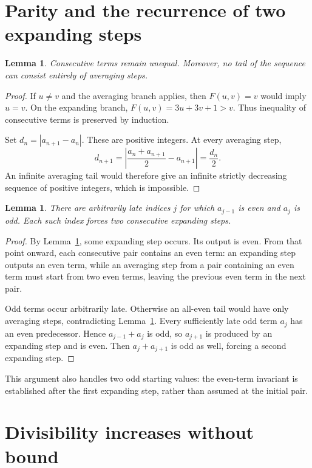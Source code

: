 \documentclass[11pt]{article}
\newtheorem{lemma}[theorem]{Lemma}
\begin{document}
\section{Parity and the recurrence of two expanding steps}

\begin{lemma}\label{lem:distinct}
Consecutive terms remain unequal. Moreover, no tail of the sequence can
consist entirely of averaging steps.
\end{lemma}
\begin{proof}
If $u\ne v$ and the averaging branch applies, then $F(u,v)=v$ would imply
$u=v$. On the expanding branch, $F(u,v)=3u+3v+1>v$. Thus inequality of
consecutive terms is preserved by induction.

Set $d_n=|a_{n+1}-a_n|$. These are positive integers. At every averaging
step,
\[
 d_{n+1}
 =\left|\frac{a_n+a_{n+1}}2-a_{n+1}\right|
 =\frac{d_n}{2}.
\]
An infinite averaging tail would therefore give an infinite strictly
decreasing sequence of positive integers, which is impossible.
\end{proof}

\begin{lemma}\label{lem:blocks}
There are arbitrarily late indices $j$ for which $a_{j-1}$ is even and
$a_j$ is odd. Each such index forces two consecutive expanding steps.
\end{lemma}
\begin{proof}
By Lemma~\ref{lem:distinct}, some expanding step occurs. Its output is
even. From that point onward, each consecutive pair contains an even term:
an expanding step outputs an even term, while an averaging step from a pair
containing an even term must start from two even terms, leaving the previous
even term in the next pair.

Odd terms occur arbitrarily late. Otherwise an all-even tail would have only
averaging steps, contradicting Lemma~\ref{lem:distinct}. Every sufficiently
late odd term $a_j$ has an even predecessor. Hence $a_{j-1}+a_j$ is odd,
so $a_{j+1}$ is produced by an expanding step and is even. Then
$a_j+a_{j+1}$ is odd as well, forcing a second expanding step.
\end{proof}

This argument also handles two odd starting values: the even-term invariant
is established after the first expanding step, rather than assumed at the
initial pair.

\section{Divisibility increases without bound}
\end{document}
